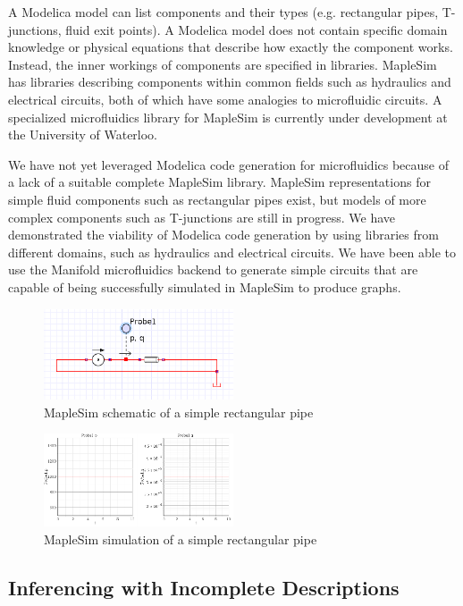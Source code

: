 A Modelica model can list components and their types (e.g. rectangular pipes, T-junctions, fluid exit points).
A Modelica model does not contain specific domain knowledge or physical equations that describe how exactly the component works.
Instead, the inner workings of components are specified in libraries.
MapleSim has libraries describing components within common fields such as hydraulics and electrical circuits, both of which have some analogies to microfluidic circuits.
A specialized microfluidics library for MapleSim is currently under development at the University of Waterloo.

We have not yet leveraged Modelica code generation for microfluidics because of a lack of a suitable complete MapleSim library.
MapleSim representations for simple fluid components such as rectangular pipes exist, but models of more complex components such as T-junctions are still in progress.
We have demonstrated the viability of Modelica code generation by using libraries from different domains, such as hydraulics and electrical circuits.
We have been able to use the Manifold microfluidics backend to generate simple circuits that are capable of being successfully simulated in MapleSim to produce graphs.

\begin{figure}[!ht]
  \caption{MapleSim schematic of a simple rectangular pipe}
  \centering
    \includegraphics[width=0.5\textwidth]{img/simple-pipe.png}
\end{figure}
\begin{figure}[!ht]
  \caption{MapleSim simulation of a simple rectangular pipe}
  \centering
    \includegraphics[width=0.5\textwidth]{img/simple-pipe-simulation.png}
\end{figure}

\subsection{Inferencing with Incomplete Descriptions}

